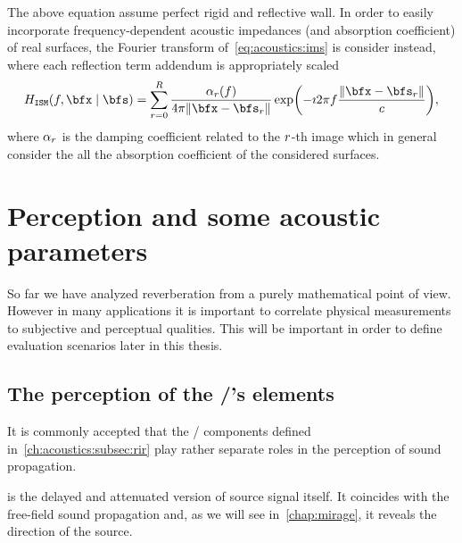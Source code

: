 The above equation assume perfect rigid and reflective wall.
In order to easily incorporate frequency-dependent acoustic impedances (and absorption coefficient)
of real surfaces, the Fourier transform of~\cref{eq:acoustics:ims} is consider instead, where
each reflection term addendum is appropriately scaled
\begin{equation}
    \label{eq:acoustics:ims}
    \rirFreq_{\mathtt{ISM}}(f, \positionMicrophone \mid \positionSource) =
        \sum_{\idxEch=0}^{\numEchs} \frac{\absCoeff_{\idxEch}(f)}{4 \pi \norm{\positionMicrophone - \positionSource_\idxEch}}
        \exp\kparen{- \Ii 2 \pi f \frac{\norm{\positionMicrophone - \positionSource_\idxEch}}{\speedOfSound}}
        ,
\end{equation}
where $\alpha_{r}$ is the damping coefficient related to the $r$-th image which in general
consider the all the absorption coefficient of the considered surfaces.


\section{Perception and some acoustic parameters}\label{ch:acoustics:sec:perception}
So far we have analyzed reverberation from a purely mathematical point of view.
However in many applications it is important to correlate physical measurements to subjective and perceptual qualities.
This will be important in order to define evaluation scenarios later in this thesis.
\subsection{The perception of the \RIR/'s elements}
It is commonly accepted that the \RIR/ components defined in~\cref{ch:acoustics:subsec:rir} play rather separate roles in the perception of sound propagation.

 is the delayed and attenuated version of source signal itself.
It coincides with the free-field sound propagation and, as we will see in~\cref{chap:mirage}, it reveals the direction of the source.

